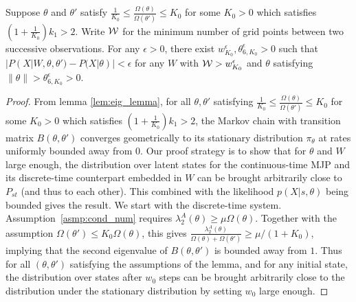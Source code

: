   \begin{lemma}
  Suppose $\theta$ and $\theta'$ satisfy $\frac{1}{K_0} \le \frac{\Omega(\theta)}{\Omega(\theta')} \leq K_0
  $ for some $K_0 > 0$ which satisfies $(1 + \frac{1}{K_0})k_1 > 2$. Write ${\mathcal W}$ for the
  minimum number of grid points between two successive observations.
  For any $\epsilon > 0$, there exist  $w_{K_0}^\epsilon,  \theta_{6, K_0}^\epsilon > 0$ such that
  $|P(X| W, \theta, \theta') - P(X | \theta)| < \epsilon$
  for any $W$ with ${\mathcal W} > w_{K_0}^\epsilon$ and $\theta $ satisfying $\| \theta \| > \theta_{6, K_0}^\epsilon > 0$.
  \label{lem:eigenvalue_lemma}
  \end{lemma}
  \begin{proof}
%
{From lemma \ref{lem:eig_lemma}, for all $\theta, \theta'$ satisfying $\frac{1}{K_0} \le \frac{\Omega(\theta)}{\Omega(\theta')} \leq K_0$ for some $K_0 > 0$ which satisfies $(1 + \frac{1}{K_0})k_1 > 2$, the Markov chain with transition matrix $B(\theta, \theta')$ converges geometrically to its stationary distribution $\pi_\theta$ at rates uniformly bounded away from 0.
}
Our proof strategy is to show that for $\theta$ and $W$ large enough, the
distribution over latent states for the continuous-time MJP and
its discrete-time counterpart embedded in $W$ can be brought arbitrarily
close to $P_{st}$ (and thus to each other). This combined with the
likelihood $p(X|s, \theta)$ being bounded  gives the result.
We start with the discrete-time system.
Assumption~\ref{asmp:cond_num} requires
$\lambda^A_2(\theta) \geq \mu \Omega(\theta)$.
Together with the assumption $\Omega(\theta') \leq K_0 \Omega(\theta)$,
this gives
$\frac{\lambda^A_2(\theta)}{\Omega(\theta) + \Omega(\theta')} \geq
\mu / (1 + K_0) $, implying that the second eigenvalue of
$B(\theta, \theta')$ is bounded away from $1$.
Thus for all $(\theta,\theta')$ satisfying the assumptions of the lemma,
and for any initial state, the distribution over states after $w_{0}$ steps
can be brought arbitrarily close to the distribution under the
stationary distribution by setting $w_{0}$ large enough.



\end{proof}
